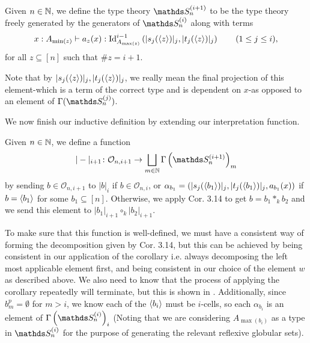 \documentclass{article}
\begin{document}
\begin{defn}
    Given $n\in\mathbb{N}$, we define the type theory $\bS_n^{(i+1)}$ to be the type theory freely generated by the generators of $\bS_n^{(i)}$ along with terms
    $$ x:A_{\min(z)}\vdash a_z(x):\operatorname{Id}^{i-1}_{A_{\max(z)}}\left(|s_j(\langle z\rangle)|_j,|t_j(\langle z\rangle)|_j\right)\qquad(1\leq j\leq i), $$
    for all $z\subseteq[n]$ such that $\#z=i+1$.
\end{defn}

Note that by $|s_j(\langle z\rangle)|_j,|t_j(\langle z\rangle)|_j$, we really mean the final projection of this element-which is a term of the correct type and is dependent on $x$-as opposed to an element of $\Gamma(\bS_n^{(j)})$.

We now finish our inductive definition by extending our interpretation function.

\begin{defn}
    Given $n\in\mathbb{N}$, we define a function
    $$ |-|_{i+1}\colon\mathcal{O}_{n,i+1}\to\bigsqcup_{m\in\N}\Gamma\left(\bS_n^{(i+1)}\right)_m $$
    by sending $b\in\mathcal{O}_{n,i+1}$ to $|b|_i$ if $b\in\mathcal{O}_{n,i}$, or $\alpha_{b_1}=\left(|s_j(\langle b_1\rangle)|_j,|t_j(\langle b_1\rangle)|_j,a_{b_1}(x)\right)$ if $b=\langle b_1\rangle$ for some $b_1\subseteq[n]$. Otherwise, we apply Cor. 3.14 to get $b=b_1*_{k}b_2$ and we send this element to $|b_1|_{i+1}\circ_{k}|b_2|_{i+1}$.
\end{defn}

To make sure that this function is well-defined, we must have a consistent way of forming the decomposition given by Cor. 3.14, but this can be achieved by being consistent in our application of the corollary i.e. always decomposing the left most applicable element first, and being consistent in our choice of the element $w$ as described above. We also need to know that the process of applying the corollary repeatedly will terminate, but this is shown in \cite{Street}. Additionally, since $b^p_m=\emptyset$ for $m>i$, we know each of the $\langle b_i\rangle$ must be $i$-cells, so each $\alpha_{b_i}$ is an element of $\Gamma\left(\bS_n^{(i)}\right)_i$ (Noting that we are considering $A_{\max(b_i)}$ as a type in $\bS_n^{(i)}$ for the purpose of generating the relevant reflexive globular sets).
\end{document}
